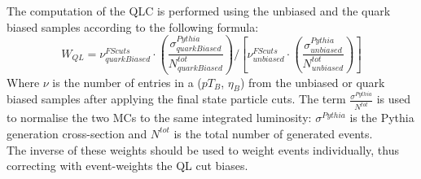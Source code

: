 
The computation of the QLC is performed using the unbiased and 
the quark biased samples according to the following formula:
$$   W_{QL} = \nu^{FScuts}_{quarkBiased} \cdot \left(  \frac{\sigma^{Pythia}_{quarkBiased}}{N^{tot}_{quarkBiased}} \right) / \left[ \nu^{FScuts}_{unbiased} \cdot \left( \frac{\sigma^{Pythia}_{unbiased}}{N^{tot}_{unbiased}} \right) \right] $$  
Where $\nu$ is the number of entries in a ($pT_B$, $\eta_B$) from 
the unbiased or quark biased samples after applying the final state 
particle cuts. The term $ \frac{\sigma^{Pythia}}{N^{tot}}$ is used 
to normalise the two MCs to the same integrated 
luminosity: $\sigma^{Pythia}$ is the Pythia generation cross-section 
and $N^{tot}$ is the total number of generated events.\\
The inverse of these weights should be used to weight events 
individually, thus correcting with event-weights the QL cut biases.\\

